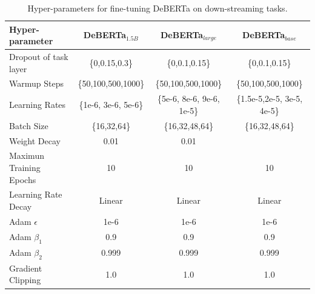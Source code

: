 \begin{table}[htb!]
   
    \centering
    \begin{tabular}{@{\hskip3pt}l@{\hskip2pt}|@{\hskip2pt} c@{\hskip2pt}|@{\hskip2pt} c@{\hskip2pt}|@{\hskip2pt} c@{\hskip2pt}}
        \toprule
          Hyper-parameter & DeBERTa$_{1.5B}$& DeBERTa$_{large}$ &  DeBERTa$_{base}$\\
        \midrule
        Dropout of task layer & \{0,0.15,0.3\}& \{0,0.1,0.15\} & \{0,0.1,0.15\} \\
        Warmup Steps & \{50,100,500,1000\}& \{50,100,500,1000\} & \{50,100,500,1000\} \\
        Learning Rates & \{1e-6, 3e-6, 5e-6\}& \{5e-6, 8e-6, 9e-6, 1e-5\} & \{1.5e-5,2e-5, 3e-5, 4e-5\} \\
        Batch Size & \{16,32,64\}& \{16,32,48,64\} & \{16,32,48,64\} \\
        Weight Decay & 0.01 & 0.01 \\
        Maximun Training Epochs & 10& 10 & 10 \\
        Learning Rate Decay & Linear & Linear & Linear \\
        Adam $\epsilon$ & 1e-6 & 1e-6 & 1e-6 \\
        Adam $\beta_1$ & 0.9 & 0.9 & 0.9 \\
        Adam $\beta_2$ & 0.999 & 0.999 & 0.999 \\
        Gradient Clipping & 1.0 & 1.0 & 1.0 \\
        \bottomrule
        \end{tabular}
    \caption{
    Hyper-parameters for fine-tuning DeBERTa on down-streaming tasks. 
    }
     \label{tbl:hyper-ft}
\end{table}

